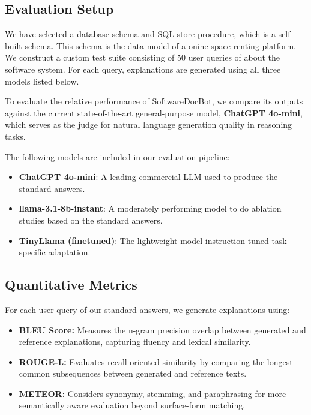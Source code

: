 \documentclass[11pt]{article}
\begin{document}
\subsection{Evaluation Setup}

We have selected a database schema and SQL store procedure, which is a self-built schema. This schema is the data model of a onine space renting platform. We construct a custom test suite consisting of 50 user queries of about the software system. For each query, explanations are generated using all three models listed below.


To evaluate the relative performance of SoftwareDocBot, we compare its outputs against the current state-of-the-art general-purpose model, \textbf{ChatGPT 4o-mini}, which serves as the judge for natural language generation quality in reasoning tasks.

The following models are included in our evaluation pipeline:

\begin{itemize}
  \item \textbf{ChatGPT 4o-mini}: A leading commercial LLM used to produce the standard answers.
  \item \textbf{llama-3.1-8b-instant}: A moderately performing model to do ablation studies based on the standard answers.
  \item \textbf{TinyLlama (finetuned)}:  The lightweight model instruction-tuned task-specific adaptation.
\end{itemize}


\subsection{Quantitative Metrics}

For each user query of our standard answers, we generate explanations using:

\begin{itemize}
  \item \textbf{BLEU Score:} Measures the n-gram precision overlap between generated and reference explanations, capturing fluency and lexical similarity.

  \item \textbf{ROUGE-L:} Evaluates recall-oriented similarity by comparing the longest common subsequences between generated and reference texts.

  \item \textbf{METEOR:} Considers synonymy, stemming, and paraphrasing for more semantically aware evaluation beyond surface-form matching.
\end{itemize}
\end{document}
